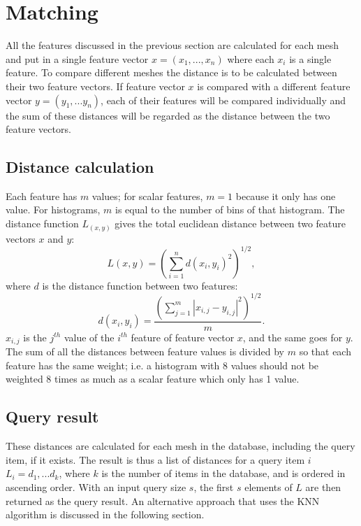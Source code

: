 \documentclass{bigdata}
\begin{document}
\section{Matching}
All the features discussed in the previous section are calculated for each mesh and put in a single feature vector $x = (x_1,...,x_n)$ where each $x_i$ is a single feature. To compare different meshes the distance is to be calculated between their two feature vectors. If feature vector $x$ is compared with a different feature vector $y = (y_1,...y_n)$, each of their features will be compared individually and the sum of these distances will be regarded as the distance between the two feature vectors.

\subsection{Distance calculation}
Each feature has $m$ values; for scalar features, $m = 1$ because it only has one value. For histograms, $m$ is equal to the number of bins of that histogram. The distance function $L_(x,y)$ gives the total euclidean distance between two feature vectors $x$ and $y$:
\begin{equation}
L(x,y) = \left(\sum\limits_{i=1}^nd(x_i,y_i)^2\right)^{1/2},
\end{equation}
where $d$ is the distance function between two features:
\begin{equation}
d(x_i,y_i) = \frac{\left(\sum\limits_{j=1}^m|x_{i,j}-y_{i,j}|^2\right)^{1/2}}{m}.
\end{equation}
 $x_{i,j}$ is the $j^{th}$ value of the $i^{th}$ feature of feature vector $x$, and the same goes for $y$. The sum of all the distances between feature values is divided by $m$ so that each feature has the same weight; i.e. a histogram with 8 values should not be weighted 8 times as much as a scalar feature which only has 1 value.  

\subsection{Query result}
These distances are calculated for each mesh in the database, including the query item, if it exists. The result is thus a list of distances for a query item $i$ $L_i = {d_1, ... d_k}$, where $k$ is the number of items in the database, and is ordered in ascending order. With an input query size $s$, the first $s$ elements of $L$ are then returned as the query result. An alternative approach that uses the KNN algorithm is discussed in the following section.
\end{document}
